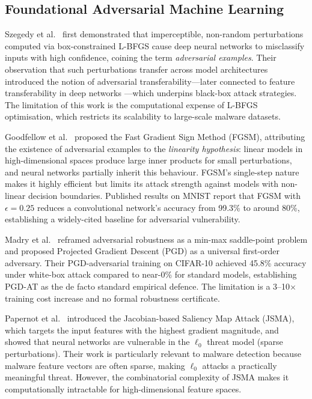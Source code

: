 \documentclass[conference]{IEEEtran}
\begin{document}
\subsection{Foundational Adversarial Machine Learning}

Szegedy et al.\ \cite{szegedy2014} first demonstrated that imperceptible, non-random perturbations computed via box-constrained L-BFGS cause deep neural networks to misclassify inputs with high confidence, coining the term \emph{adversarial examples}. Their observation that such perturbations transfer across model architectures introduced the notion of adversarial transferability---later connected to feature transferability in deep networks \cite{yosinski2014}---which underpins black-box attack strategies. The limitation of this work is the computational expense of L-BFGS optimisation, which restricts its scalability to large-scale malware datasets.

Goodfellow et al.\ \cite{goodfellow2015} proposed the Fast Gradient Sign Method (FGSM), attributing the existence of adversarial examples to the \emph{linearity hypothesis}: linear models in high-dimensional spaces produce large inner products for small perturbations, and neural networks partially inherit this behaviour. FGSM's single-step nature makes it highly efficient but limits its attack strength against models with non-linear decision boundaries. Published results on MNIST report that FGSM with $\epsilon = 0.25$ reduces a convolutional network's accuracy from 99.3\% to around 80\%, establishing a widely-cited baseline for adversarial vulnerability.

Madry et al.\ \cite{madry2018} reframed adversarial robustness as a min-max saddle-point problem and proposed Projected Gradient Descent (PGD) as a universal first-order adversary. Their PGD-adversarial training on CIFAR-10 achieved 45.8\% accuracy under white-box attack compared to near-0\% for standard models, establishing PGD-AT as the de facto standard empirical defence. The limitation is a 3--10$\times$ training cost increase and no formal robustness certificate.

Papernot et al.\ \cite{papernot2016} introduced the Jacobian-based Saliency Map Attack (JSMA), which targets the input features with the highest gradient magnitude, and showed that neural networks are vulnerable in the $\ell_0$ threat model (sparse perturbations). Their work is particularly relevant to malware detection because malware feature vectors are often sparse, making $\ell_0$ attacks a practically meaningful threat. However, the combinatorial complexity of JSMA makes it computationally intractable for high-dimensional feature spaces.
\end{document}
